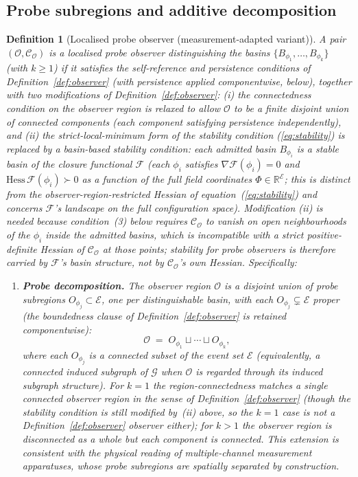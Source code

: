 \documentclass[12pt]{article}
\newtheorem{definition}[theorem]{Definition}
\newcommand{\Ecal}{\mathcal{E}}
\newcommand{\Gcal}{\mathcal{G}}
\newcommand{\Fcal}{\mathcal{F}}
\newcommand{\Ocal}{\mathcal{O}}
\newcommand{\Ccal}{\mathcal{C}}
\begin{document}
\subsection{Probe subregions and additive decomposition}\label{subsec:probe}

\begin{definition}[Localised probe observer (measurement-adapted variant)]\label{def:probe}
A pair $(\Ocal, \Ccal_\Ocal)$ is a \emph{localised probe observer distinguishing} the basins $\{B_{\phi_1}, \ldots, B_{\phi_k}\}$ (with $k \geq 1$) if it satisfies the self-reference and persistence conditions of Definition~\ref{def:observer} (with persistence applied componentwise, below), together with two modifications of Definition~\ref{def:observer}: (i) the connectedness condition on the observer region is relaxed to allow $\Ocal$ to be a finite disjoint union of connected components (each component satisfying persistence independently), and (ii) the strict-local-minimum form of the stability condition (\ref{eq:stability}) is replaced by a \emph{basin-based stability condition}: each admitted basin $B_{\phi_i}$ is a stable basin of the closure functional $\Fcal$ (each $\phi_i$ satisfies $\nabla\Fcal(\phi_i) = 0$ and $\mathrm{Hess}\, \Fcal(\phi_i) \succ 0$ as a function of the full field coordinates $\Phi \in \mathbb{R}^\Ecal$; this is distinct from the observer-region-restricted Hessian of equation~(\ref{eq:stability}) and concerns $\Fcal$'s landscape on the full configuration space). Modification (ii) is needed because condition~(3) below requires $\Ccal_\Ocal$ to vanish on open neighbourhoods of the $\phi_i$ inside the admitted basins, which is incompatible with a strict positive-definite Hessian of $\Ccal_\Ocal$ at those points; stability for probe observers is therefore carried by $\Fcal$'s basin structure, not by $\Ccal_\Ocal$'s own Hessian. Specifically:
\begin{enumerate}
    \item \textbf{Probe decomposition.} The observer region $\Ocal$ is a disjoint union of \emph{probe subregions} $O_{\phi_j} \subset \Ecal$, one per distinguishable basin, with each $O_{\phi_j} \subsetneq \Ecal$ proper (the boundedness clause of Definition~\ref{def:observer} is retained componentwise):
    \begin{equation}
        \Ocal \;=\; O_{\phi_1} \sqcup \cdots \sqcup O_{\phi_k},
    \end{equation}
    where each $O_{\phi_j}$ is a connected subset of the event set $\Ecal$ (equivalently, a connected induced subgraph of $\Gcal$ when $\Ocal$ is regarded through its induced subgraph structure). For $k = 1$ the region-connectedness matches a single connected observer region in the sense of Definition~\ref{def:observer} (though the stability condition is still modified by~(ii) above, so the $k=1$ case is not a Definition~\ref{def:observer} observer either); for $k > 1$ the observer region is disconnected as a whole but each component is connected. This extension is consistent with the physical reading of multiple-channel measurement apparatuses, whose probe subregions are spatially separated by construction.

\end{enumerate}
\end{definition}
\end{document}
